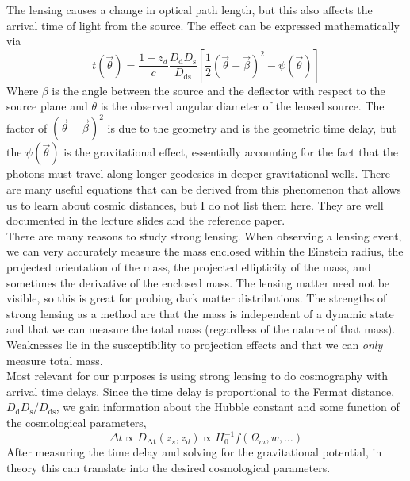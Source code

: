 \documentclass[10pt]{article}
\numberwithin{equation}{section}
\newcommand{\n}{\noindent}
\begin{document}
	\n The lensing causes a change in optical path length, but this also affects the arrival time of light from the source. The effect can be expressed mathematically via
	\begin{equation}
		\label{eq:strong_lensing:1} t(\vec{\theta}) = \frac{1+z_d}{c}\frac{D_{\mathrm{d}}D_{\mathrm{s}}}{D_{\mathrm{ds}}}\left[\frac{1}{2}(\vec{\theta}-\vec{\beta})^2-\psi(\vec{\theta})\right]
	\end{equation}
	Where $\beta$ is the angle between the source and the deflector with respect to the source plane and $\theta$ is the observed angular diameter of the lensed source. The factor of $(\vec{\theta}-\vec{\beta})^2$ is due to the geometry and is the geometric time delay, but the $\psi(\vec{\theta})$ is the gravitational effect, essentially accounting for the fact that the photons must travel along longer geodesics in deeper gravitational wells. There are many useful equations that can be derived from this phenomenon that allows us to learn about cosmic distances, but I do not list them here. They are well documented in the lecture slides and the reference paper.\\
	
	\n There are many reasons to study strong lensing. When observing a lensing event, we can very accurately measure the mass enclosed within the Einstein radius, the projected orientation of the mass, the projected ellipticity of the mass, and sometimes the derivative of the enclosed mass. The lensing matter need not be visible, so this is great for probing dark matter distributions. The strengths of strong lensing as a method are that the mass is independent of a dynamic state and that we can measure the total mass (regardless of the nature of that mass). Weaknesses lie in the susceptibility to projection effects and that we can \emph{only} measure total mass.\\
	
	\n Most relevant for our purposes is using strong lensing to do cosmography with arrival time delays. Since the time delay is proportional to the Fermat distance, $D_{\mathrm{d}}D_{\mathrm{s}}/D_{\mathrm{ds}}$, we gain information about the Hubble constant and some function of the cosmological parameters,
	\begin{equation}
		\label{eq:strong_lensing:2} \Delta t \propto D_{\mathrm{\Delta t}}(z_s,z_d)\propto H_0^{-1} f(\Omega_m,w,\ldots)
	\end{equation}
	After measuring the time delay and solving for the gravitational potential, in theory this can translate into the desired cosmological parameters.
\end{document}
